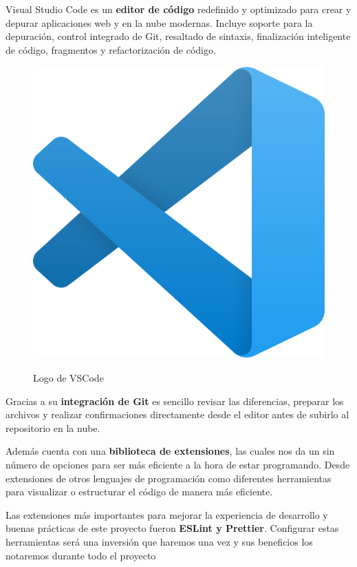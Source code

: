 \documentclass[12pt,twoside,titlepage]{report}
\begin{document}
Visual Studio Code es un \textbf{editor de código} redefinido y optimizado para crear y depurar aplicaciones web y en la nube modernas. Incluye soporte para la depuración, control integrado de Git, resaltado de sintaxis, finalización inteligente de código, fragmentos y refactorización de código.

\begin{figure}[H]
    \centering
    \includegraphics[scale=0.035]{VSCode/VSCode}
    \label{fig:VSCodeLogo}
    \caption{Logo de VSCode}
\end{figure}

Gracias a su \textbf{integración de Git} es sencillo revisar las diferencias, preparar los archivos y realizar confirmaciones directamente desde el editor antes de subirlo al repositorio en la nube.

Además cuenta con una \textbf{biblioteca de extensiones}, las cuales nos da un sin número de opciones para ser más eficiente a la hora de estar programando. Desde extensiones de otros lenguajes de programación como diferentes herramientas para visualizar o estructurar el código de manera más eficiente.

Las extensiones más importantes para mejorar la experiencia de desarrollo y buenas prácticas de este proyecto fueron \textbf{ESLint y Prettier}. Configurar estas herramientas será una inversión que haremos una vez y sus beneficios los notaremos durante todo el proyecto
\end{document}
